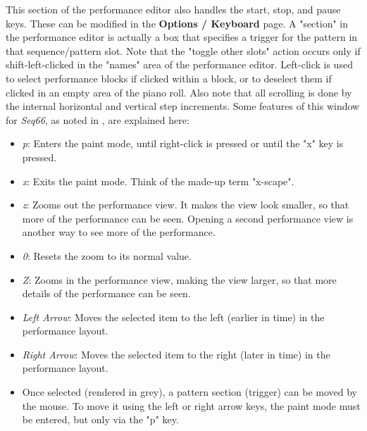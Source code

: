    This section of the performance editor also handles the start, stop, and
   pause keys.  These can be modified in the \textbf{Options / Keyboard} page.
   A "section" in the performance editor is actually a box that
   specifies a trigger for the pattern in that sequence/pattern slot.
   Note that the "toggle other slots" action occurs only if shift-left-clicked
   in the "names" area of the performance editor.
   Left-click is used to select performance blocks if clicked within
   a block, or to deselect them if clicked in an empty area of the piano roll.
   Also note that all scrolling is done by the internal horizontal and vertical
   step increments.
   Some features of this window for \textsl{Seq66},
   as noted in , are explained here:

   \begin{itemize}
      \item \textsl{p}:  Enters the paint mode, until right-click is pressed or
         until the "x" key is pressed.
      \item \textsl{x}:  Exits the paint mode.  Think of the made-up term
         "x-scape".
      \item \textsl{z}:  Zooms out the performance view.  It makes the view
         look smaller, so that more of the performance can be seen.
         Opening a second performance view is another way to see more
         of the performance.
      \item \textsl{0}:  Resets the zoom to its normal value.
      \item \textsl{Z}:  Zooms in the performance view, making the view
         larger, so that more details of the performance can be seen.
      \item \textsl{Left Arrow}:  Moves the selected item to the left (earlier
         in time) in the performance layout.
      \item \textsl{Right Arrow}:  Moves the selected item to the right (later
         in time) in the performance layout.
      \item Once selected (rendered in grey), a pattern section (trigger)
         can be moved by the mouse.
         To move it using the left or right
         arrow keys, the paint mode must be entered, but only via the "p"
         key.
   \end{itemize}

